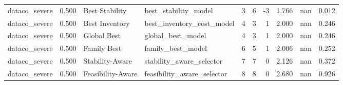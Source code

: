 \begin{table}
{\begin{tabular}{lrllrrrrrr}
 dataco\_severe &             0.500 &     Best Stability &        best\_stability\_model &                              3 &                                       6 &                       -3 &                  1.766 &               nan &                  0.012 \\
 dataco\_severe &             0.500 &     Best Inventory &   best\_inventory\_cost\_model &                              4 &                                       3 &                        1 &                  2.000 &               nan &                  0.246 \\
 dataco\_severe &             0.500 &        Global Best &           global\_best\_model &                              4 &                                       3 &                        1 &                  2.000 &               nan &                  0.246 \\
 dataco\_severe &             0.500 &        Family Best &           family\_best\_model &                              6 &                                       5 &                        1 &                  2.006 &               nan &                  0.252 \\
 dataco\_severe &             0.500 &    Stability-Aware &    stability\_aware\_selector &                              7 &                                       7 &                        0 &                  2.126 &               nan &                  0.372 \\
 dataco\_severe &             0.500 &  Feasibility-Aware &  feasibility\_aware\_selector &                              8 &                                       8 &                        0 &                  2.680 &               nan &                  0.926 \\
\bottomrule
\end{tabular}
}

\end{table}
